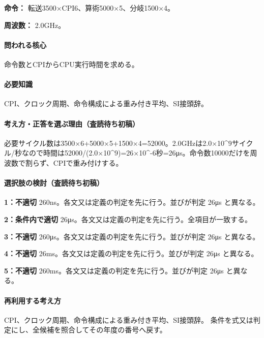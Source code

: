 \noindent\textbf{命令：} 転送3500×CPI6、算術5000×5、分岐1500×4。\par

\noindent\textbf{周波数：} 2.0GHz。\par

\paragraph{問われる核心} 命令数とCPIからCPU実行時間を求める。

\paragraph{必要知識} CPI、クロック周期、命令構成による重み付き平均、SI接頭辞。

\paragraph{考え方・正答を選ぶ理由（査読待ち初稿）} 必要サイクル数は3500×6+5000×5+1500×4=\allowbreak{}52000。2.0GHzは2.0×10\textasciicircum{}9サイクル/秒なので時間は52000/(2.0×10\textasciicircum{}9)=\allowbreak{}26×10\textasciicircum{}-6秒=26μs。命令数10000だけを周波数で割らず、CPIで重み付けする。

\paragraph{選択肢の検討（査読待ち初稿）}\mbox{}\par

\noindent\textbf{1：不適切} 260ns。各文又は定義の判定を先に行う。並びが判定 26μs と異なる。\par

\noindent\textbf{2：条件内で適切} 26μs。各文又は定義の判定を先に行う。全項目が一致する。\par

\noindent\textbf{3：不適切} 260μs。各文又は定義の判定を先に行う。並びが判定 26μs と異なる。\par

\noindent\textbf{4：不適切} 26ms。各文又は定義の判定を先に行う。並びが判定 26μs と異なる。\par

\noindent\textbf{5：不適切} 260ms。各文又は定義の判定を先に行う。並びが判定 26μs と異なる。\par

\paragraph{再利用する考え方} CPI、クロック周期、命令構成による重み付き平均、SI接頭辞。 条件を式又は判定にし、全候補を照合してその年度の番号へ戻す。

